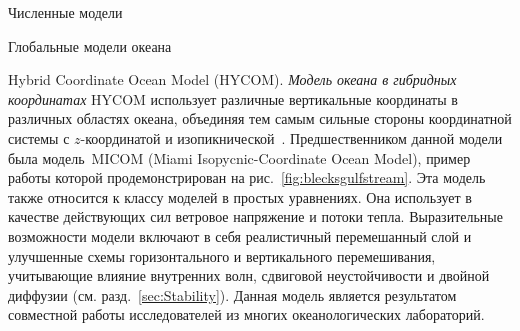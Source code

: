 \begin{chapter}{Численные модели}
\begin{section}{Глобальные модели океана}
\begin{paragraph}{Hybrid Coordinate Ocean Model (HYCOM).}
\emph{Модель океана в гибридных координатах} HYCOM
использует различные вертикальные координаты в различных областях океана,
объединяя тем самым сильные стороны координатной системы с $z$-координатой
и изопикнической~\cite{Bleck:2002}. Предшественником данной модели была модель~MICOM
(Miami Isopycnic-Coordinate Ocean Model), пример работы которой 
продемонстрирован на рис.~\ref{fig:blecksgulfstream}. Эта модель также
относится к классу моделей в простых уравнениях. Она использует в качестве
действующих сил ветровое напряжение
и потоки тепла. Выразительные возможности модели включают
в себя реалистичный перемешанный слой и улучшенные схемы горизонтального
и вертикального перемешивания, учитывающие влияние внутренних волн, сдвиговой
неустойчивости и двойной диффузии (см. разд.~\ref{sec:Stability}). Данная
модель является результатом совместной работы исследователей из многих
океанологических лабораторий.
%
\end{paragraph}



\end{section}
\end{chapter}
